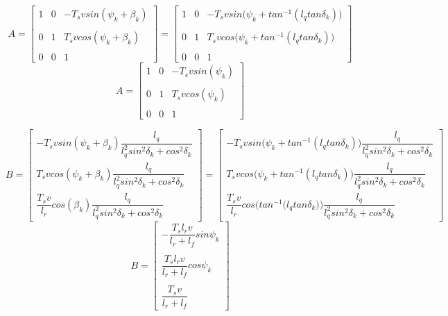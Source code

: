 \begin{equation}
 A =
  \begin{bmatrix}
    1 & 0 & -T_s v sin(\psi_k + \beta_k) \\\\
    0 & 1 & T_s v cos(\psi_k + \beta_k) \\\\
    0 & 0 & 1
  \end{bmatrix}
  =
  \begin{bmatrix}
    1 & 0 & -T_s v sin\Big(\psi_k + tan^{-1} (l_q tan\delta_k)\Big) \\\\
    0 & 1 & T_s v cos\Big(\psi_k + tan^{-1} (l_q tan\delta_k)\Big) \\\\
    0 & 0 & 1
  \end{bmatrix}
\end{equation}
\begin{equation}
 A =
  \begin{bmatrix}
    1 & 0 & -T_s v sin(\psi_k) \\\\
    0 & 1 & T_s v cos(\psi_k) \\\\
    0 & 0 & 1
  \end{bmatrix}
\end{equation}

\begin{equation}
 B =
  \begin{bmatrix}
    -T_s v sin(\psi_k + \beta_k) \dfrac{l_q}{l_q^2 sin^2\delta_k + cos^2\delta_k} \\
    T_s v cos(\psi_k + \beta_k) \dfrac{l_q}{l_q^2 sin^2\delta_k + cos^2\delta_k} \\
    \dfrac{T_s v}{l_r} cos(\beta_k) \dfrac{l_q}{l_q^2 sin^2\delta_k + cos^2\delta_k}
  \end{bmatrix}
  =
  \begin{bmatrix}
    -T_s v sin\Big(\psi_k + tan^{-1} (l_q tan\delta_k)\Big) \dfrac{l_q}{l_q^2 sin^2\delta_k + cos^2\delta_k} \\
    T_s v cos\Big(\psi_k + tan^{-1} (l_q tan\delta_k)\Big) \dfrac{l_q}{l_q^2 sin^2\delta_k + cos^2\delta_k} \\
    \dfrac{T_s v}{l_r} cos\Bigg(tan^{-1} \Big(l_q tan\delta_k\Big)\Bigg) \dfrac{l_q}{l_q^2 sin^2\delta_k + cos^2\delta_k}
  \end{bmatrix}
\end{equation}
\begin{equation}
 B =
  \begin{bmatrix}
    -\dfrac{T_s l_r v}{l_r + l_f} sin\psi_k \\\\
    \dfrac{T_s l_r v}{l_r + l_f} cos\psi_k \\\\
    \dfrac{T_s v}{l_r+l_f}
  \end{bmatrix}
\end{equation}

